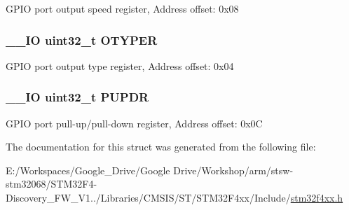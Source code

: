 G\-P\-I\-O port output speed register, Address offset\-: 0x08 \hypertarget{struct_g_p_i_o___type_def_a9543592bda60cb5261075594bdeedac9}{
\subsubsection[{O\-T\-Y\-P\-E\-R}]{\setlength{\rightskip}{0pt plus 5cm}\-\_\-\-\_\-\-I\-O uint32\-\_\-t O\-T\-Y\-P\-E\-R}}\label{struct_g_p_i_o___type_def_a9543592bda60cb5261075594bdeedac9}
G\-P\-I\-O port output type register, Address offset\-: 0x04 \hypertarget{struct_g_p_i_o___type_def_abeed38529bd7b8de082e490e5d4f1727}{
\subsubsection[{P\-U\-P\-D\-R}]{\setlength{\rightskip}{0pt plus 5cm}\-\_\-\-\_\-\-I\-O uint32\-\_\-t P\-U\-P\-D\-R}}\label{struct_g_p_i_o___type_def_abeed38529bd7b8de082e490e5d4f1727}
G\-P\-I\-O port pull-\/up/pull-\/down register, Address offset\-: 0x0\-C 

The documentation for this struct was generated from the following file\-:\begin{DoxyCompactItemize}
\item 
E\-:/\-Workspaces/\-Google\-\_\-\-Drive/\-Google Drive/\-Workshop/arm/stsw-\/stm32068/\-S\-T\-M32\-F4-\/\-Discovery\-\_\-\-F\-W\-\_\-\-V1../\-Libraries/\-C\-M\-S\-I\-S/\-S\-T/\-S\-T\-M32\-F4xx/\-Include/\hyperlink{stm32f4xx_8h}{stm32f4xx.\-h}\end{DoxyCompactItemize}
